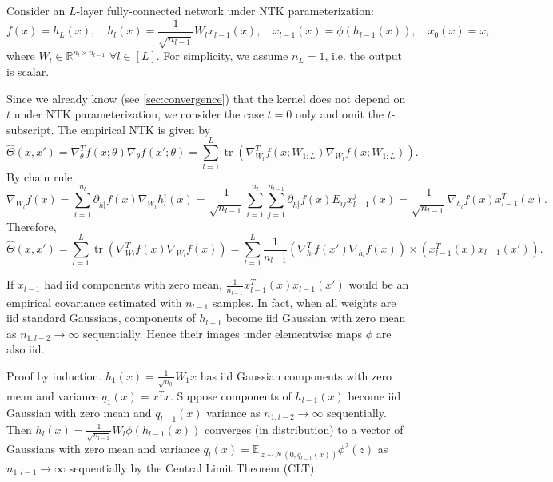 \documentclass{article}
\newcommand{\EE}{\mathbb{E}\,}
\newcommand{\RR}{\mathbb{R}}
\newcommand{\NN}{\mathcal{N}}
\DeclareMathOperator*{\tr}{tr}
\begin{document}
    Consider an $L$-layer fully-connected network under NTK parameterization:
    \begin{equation}
        f(x) = h_L(x),
        \quad
        h_l(x) = \frac{1}{\sqrt{n_{l-1}}} W_l x_{l-1}(x),
        \quad
        x_{l-1}(x) = \phi(h_{l-1}(x)),
        \quad
        x_0(x) = x,
    \end{equation}
    where $W_l \in \RR^{n_l \times n_{l-1}}$ $\forall l \in [L]$.
    For simplicity, we assume $n_L=1$, i.e. the output is scalar.

    Since we already know (see \cref{sec:convergence}) that the kernel does not depend on $t$ under NTK parameterization, we consider the case $t=0$ only and omit the $t$-subscript.
    The empirical NTK is given by
    \begin{equation}
        \hat\Theta(x,x')
        = \nabla^T_\theta f(x;\theta) \nabla_\theta f(x';\theta)
        = \sum_{l=1}^L \tr\left(\nabla^T_{W_l} f(x;W_{1:L}) \nabla_{W_l} f(x;W_{1:L})\right).
    \end{equation}
    By chain rule,
    \begin{equation}
        \nabla_{W_l} f(x) 
        = \sum_{i=1}^{n_l} \partial_{h_l^i} f(x) \nabla_{W_l} h_l^i(x) 
        = \frac{1}{\sqrt{n_{l-1}}} \sum_{i=1}^{n_l} \sum_{j=1}^{n_{l-1}} \partial_{h_l^i} f(x) E_{ij} x_{l-1}^j(x) 
        = \frac{1}{\sqrt{n_{l-1}}} \nabla_{h_l} f(x) x_{l-1}^T(x).
    \end{equation}
    Therefore,
    \begin{equation}
        \hat\Theta(x,x')
        = \sum_{l=1}^L \tr\left(\nabla^T_{W_l} f(x) \nabla_{W_l} f(x)\right)
        = \sum_{l=1}^L \frac{1}{n_{l-1}} \left(\nabla^T_{h_l} f(x') \nabla_{h_l} f(x)\right) \times \left(x_{l-1}^T(x) x_{l-1}(x')\right).
    \end{equation}

    If $x_{l-1}$ had iid components with zero mean, $\frac{1}{n_{l-1}} x_{l-1}^T(x) x_{l-1}(x')$ would be an empirical covariance estimated with $n_{l-1}$ samples.
    In fact, when all weights are iid standard Gaussians, components of $h_{l-1}$ become iid Gaussian with zero mean as $n_{1:l-2} \to \infty$ sequentially.
    Hence their images under elementwise maps $\phi$ are also iid.
    
    Proof by induction.
    $h_1(x) = \frac{1}{\sqrt{n_0}} W_1 x$ has iid Gaussian components with zero mean and variance $q_1(x) = x^T x$.
    Suppose components of $h_{l-1}(x)$ become iid Gaussian with zero mean and $q_{l-1}(x)$ variance as $n_{1:l-2} \to \infty$ sequentially.
    Then $h_l(x) = \frac{1}{\sqrt{n_{l-1}}} W_l \phi(h_{l-1}(x))$ converges (in distribution) to a vector of Gaussians with zero mean and variance $q_l(x) = \EE_{z \sim \NN(0,q_{l-1}(x))} \phi^2(z)$ as $n_{1:l-1} \to \infty$ sequentially by the Central Limit Theorem (CLT).
\end{document}
